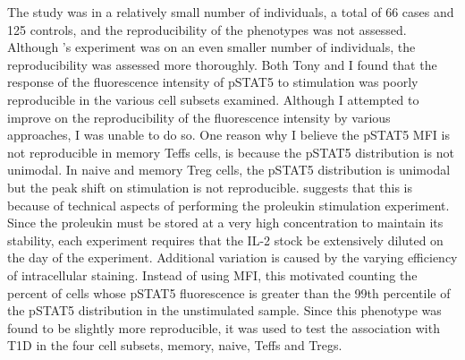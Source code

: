 The \citet{Long:2010ej} study was in a relatively small number of individuals, a total of 66 cases and 125 controls, and the reproducibility of the phenotypes was not assessed.
Although 's experiment was on an even smaller number of individuals, the reproducibility was assessed more thoroughly.
Both Tony and I found that the response of the fluorescence intensity of pSTAT5 to stimulation was poorly reproducible in the various cell subsets examined.
Although I attempted to improve on the reproducibility of the fluorescence intensity by various approaches,
I was unable to do so.
One reason why I believe the pSTAT5 MFI is not reproducible in memory Teffs cells, is because the pSTAT5 distribution is not unimodal.
In naive and memory Treg cells, the pSTAT5 distribution is unimodal but the peak shift on stimulation is not reproducible.
 suggests that this is because of technical aspects of performing the proleukin stimulation experiment.
Since the proleukin must be stored at a very high concentration to maintain its stability, each experiment requires that the IL-2 stock be extensively diluted on the day of the experiment.
Additional variation is caused by the varying efficiency of intracellular staining.
Instead of using MFI, this motivated counting the percent of cells whose pSTAT5 fluorescence is greater than the 99th percentile of the pSTAT5 distribution in the unstimulated sample.
Since this phenotype was found to be slightly more reproducible, it was used to test the association with T1D in the four cell subsets, memory, naive, Teffs and Tregs.



